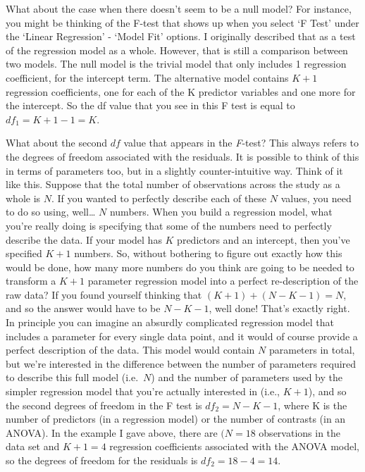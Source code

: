 \documentclass[
  a4paper,
]{book}
\begin{document}
What about the case when there doesn't seem to be a null model? For
instance, you might be thinking of the F-test that shows up when you
select `F Test' under the `Linear Regression' - `Model Fit' options. I
originally described that as a test of the regression model as a whole.
However, that is still a comparison between two models. The null model
is the trivial model that only includes 1 regression coefficient, for
the intercept term. The alternative model contains \(K + 1\) regression
coefficients, one for each of the K predictor variables and one more for
the intercept. So the df value that you see in this F test is equal to
\(df_1 = K + 1 - 1 = K\).

What about the second \(df\) value that appears in the \emph{F}-test?
This always refers to the degrees of freedom associated with the
residuals. It is possible to think of this in terms of parameters too,
but in a slightly counter-intuitive way. Think of it like this. Suppose
that the total number of observations across the study as a whole is
\(N\). If you wanted to perfectly describe each of these \(N\) values,
you need to do so using, well\ldots{} \(N\) numbers. When you build a
regression model, what you're really doing is specifying that some of
the numbers need to perfectly describe the data. If your model has \(K\)
predictors and an intercept, then you've specified \(K + 1\) numbers.
So, without bothering to figure out exactly how this would be done, how
many more numbers do you think are going to be needed to transform a
\(K + 1\) parameter regression model into a perfect re-description of
the raw data? If you found yourself thinking that
\((K + 1) + (N - K - 1) = N\), and so the answer would have to be
\(N - K - 1\), well done! That's exactly right. In principle you can
imagine an absurdly complicated regression model that includes a
parameter for every single data point, and it would of course provide a
perfect description of the data. This model would contain \(N\)
parameters in total, but we're interested in the difference between the
number of parameters required to describe this full model (i.e.~\(N\))
and the number of parameters used by the simpler regression model that
you're actually interested in (i.e., \(K + 1\)), and so the second
degrees of freedom in the F test is \(df_2 = N - K - 1\), where K is the
number of predictors (in a regression model) or the number of contrasts
(in an ANOVA). In the example I gave above, there are \((N = 18\)
observations in the data set and \(K + 1 = 4\) regression coefficients
associated with the ANOVA model, so the degrees of freedom for the
residuals is \(df_2 = 18 - 4 = 14\).
\end{document}
